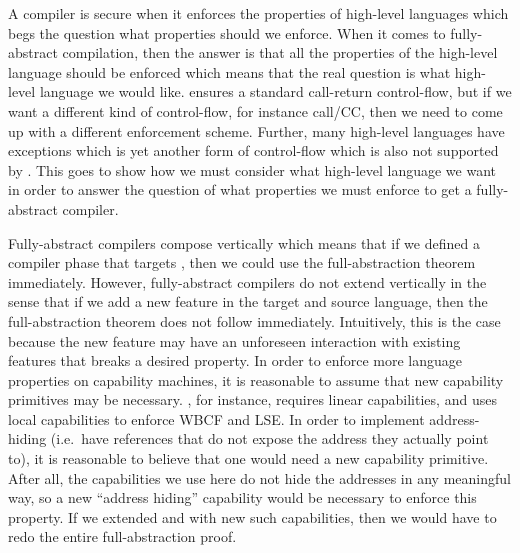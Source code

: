 

\begin{jversion}
  A compiler is secure when it enforces the properties of high-level languages which begs the question what properties should we enforce.
  When it comes to fully-abstract compilation, then the answer is that all the properties of the high-level language should be enforced which means that the real question is what high-level language we would like.
  \stktokens{} ensures a standard call-return control-flow, but if we want a different kind of control-flow, for instance call/CC, then we need to come up with a different enforcement scheme.
  Further, many high-level languages have exceptions which is yet another form of control-flow which is also not supported by \stktokens{}.
  This goes to show how we must consider what high-level language we want in order to answer the question of what properties we must enforce to get a fully-abstract compiler.
  
  Fully-abstract compilers compose vertically which means that if we defined a compiler phase that targets \srccm{}, then we could use the full-abstraction theorem immediately.
  However, fully-abstract compilers do not extend vertically in the sense that if we add a new feature in the target and source language, then the full-abstraction theorem does not follow immediately.
  Intuitively, this is the case because the new feature may have an unforeseen interaction with existing features that breaks a desired property.
  In order to enforce more language properties on capability machines, it is reasonable to assume that new capability primitives may be necessary.
  \stktokens{}, for instance, requires linear capabilities, and \citet{skorstengaard_reasoning_2017} uses local capabilities to enforce WBCF and LSE.
  In order to implement address-hiding (i.e.\ have references that do not expose the address they actually point to), it is reasonable to believe that one would need a new capability primitive.
  After all, the capabilities we use here do not hide the addresses in any meaningful way, so a new ``address hiding'' capability would be necessary to enforce this property.
  If we extended \trgcm{} and \srccm{} with new such capabilities, then we would have to redo the entire full-abstraction proof.


\end{jversion}
